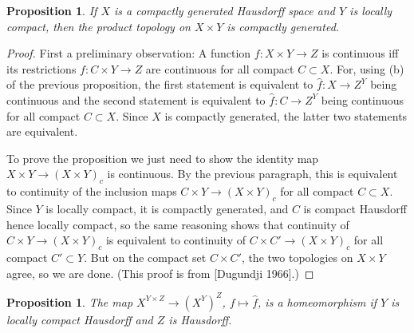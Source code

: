 \documentclass{article}
\newtheorem{proposition}[theorem]{Proposition}
\theoremstyle{definition}
\begin{document}
\begin{proposition}
If $X$ is a compactly generated Hausdorff space and $Y$ is locally compact, then the product topology on $X \times Y$ is compactly generated.
\end{proposition}

\begin{proof}
First a preliminary observation: A function $f: X \times Y \to Z$ is continuous iff its restrictions $f: C \times Y \to Z$ are continuous for all compact $C \subset X$. For, using (b) of the previous proposition, the first statement is equivalent to $\hat{f}: X \to Z^Y$ being continuous and the second statement is equivalent to $\hat{f}: C \to Z^Y$ being continuous for all compact $C \subset X$. Since $X$ is compactly generated, the latter two statements are equivalent.

To prove the proposition we just need to show the identity map $X \times Y \to (X \times Y)_c$ is continuous. By the previous paragraph, this is equivalent to continuity of the inclusion maps $C \times Y \to (X \times Y)_c$ for all compact $C \subset X$. Since $Y$ is locally compact, it is compactly generated, and $C$ is compact Hausdorff hence locally compact, so the same reasoning shows that continuity of $C \times Y \to (X \times Y)_c$ is equivalent to continuity of $C \times C' \to (X \times Y)_c$ for all compact $C' \subset Y$. But on the compact set $C \times C'$, the two topologies on $X \times Y$ agree, so we are done. (This proof is from [Dugundji 1966].)
\end{proof}

\begin{proposition}
The map $X^{Y \times Z} \to (X^Y)^Z$, $f \mapsto \hat{f}$, is a homeomorphism if $Y$ is locally compact Hausdorff and $Z$ is Hausdorff.
\end{proposition}
\end{document}
